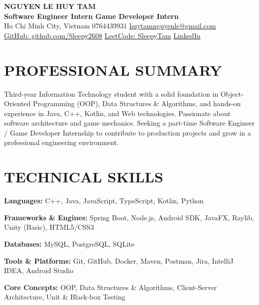 \documentclass[10pt,a4paper]{extarticle}
\begin{document}

\begin{center}
    {\Large\bfseries\color{primary}
    NGUYEN LE HUY TAM}\\[3pt]

    \textbf{Software Engineer Intern \textbar{} Game Developer Intern}\\[4pt]

    Ho Chi Minh City, Vietnam
    \textbar{} 0764439931
    \textbar{}
    \href{mailto:huytamnguyenle@gmail.com}{huytamnguyenle@gmail.com}\\[2pt]

    \href{https://github.com/Sleepy2608}{GitHub: github.com/Sleepy2608}
    \textbar{}
    \href{https://leetcode.com/u/SleepyTam/}{LeetCode: SleepyTam}
    \textbar{}
    \href{https://www.linkedin.com/in/huytamnguyenle/}{LinkedIn}
\end{center}


\section{PROFESSIONAL SUMMARY}

Third-year Information Technology student with a solid foundation in Object-Oriented Programming (OOP), Data Structures \& Algorithms, and hands-on experience in Java, C++, Kotlin, and Web technologies. Passionate about software architecture and game mechanics. Seeking a part-time Software Engineer / Game Developer Internship to contribute to production projects and grow in a professional engineering environment.


\section{TECHNICAL SKILLS}

\textbf{Languages:} C++, Java, JavaScript, TypeScript, Kotlin, Python

\textbf{Frameworks \& Engines:} Spring Boot, Node.js, Android SDK, JavaFX, Raylib, Unity (Basic), HTML5/CSS3

\textbf{Databases:} MySQL, PostgreSQL, SQLite

\textbf{Tools \& Platforms:} Git, GitHub, Docker, Maven, Postman, Jira, IntelliJ IDEA, Android Studio

\textbf{Core Concepts:} OOP, Data Structures \& Algorithms, Client-Server Architecture, Unit \& Black-box Testing
\end{document}
